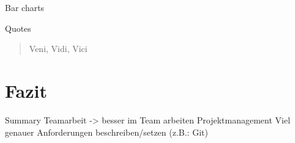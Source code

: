 \documentclass[10pt, compress]{beamer}
\begin{document}

\begin{frame}{Bar charts}
  
\end{frame}
\begin{frame}{Quotes}
  \begin{quote}
    Veni, Vidi, Vici
  \end{quote}
\end{frame}

\section{Fazit}
\begin{frame}{Summary}
Teamarbeit -> besser im Team arbeiten
Projektmanagement
Viel genauer Anforderungen beschreiben/setzen (z.B.: Git)

\end{frame}

\end{document}
